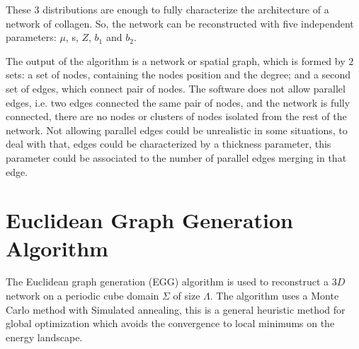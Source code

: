 These $3$ distributions are enough to fully characterize the architecture of a
network of collagen. So, the network can be reconstructed with five
independent parameters:
$\mu$, s, $Z$, $b_1$ and $b_2$.


The output of the algorithm is a network or spatial \gls{graph}, which is formed
by $2$ sets: a set of nodes, containing the nodes
position and the degree; and a second set of edges, which connect pair of
nodes. The software
does not allow parallel edges, i.e. two edges connected the same pair of nodes,
and the network is fully connected,  there are no nodes or clusters of nodes
isolated  from the rest of the network. Not allowing parallel edges could be
unrealistic in some situations, to deal with that, edges could be characterized
by a thickness parameter, this parameter could be associated to the number of
parallel edges merging in that edge.
\section{Euclidean Graph Generation Algorithm}
The Euclidean graph generation (EGG) algorithm is used to reconstruct a $3D$
network on a periodic cube domain $\Sigma$ of size $\Lambda$. The algorithm uses
a Monte Carlo method with Simulated annealing, this is a general heuristic
method for global optimization which avoids the convergence to local minimums on
the energy landscape.

